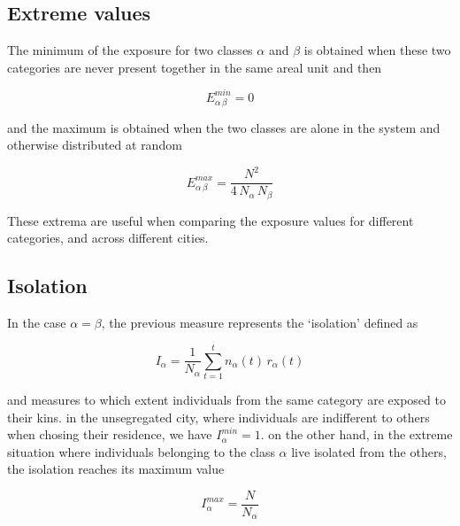 \subsection{Extreme values}
\label{sub:extreme_values}

The minimum of the exposure for two classes $\alpha$ and $\beta$ is obtained
when these two categories are never present together in the same areal unit and
then

\begin{equation}
    E_{\alpha\,\beta}^{min} = 0 
\end{equation}

and the maximum is obtained when the two classes are alone in the system and
otherwise distributed at random

\begin{equation}
    E_{\alpha\,\beta}^{max} = \frac{N^2}{4\,N_\alpha\, N_\beta}
\end{equation}

These extrema are useful when comparing the exposure values for different
categories, and across different cities.



\subsection{Isolation}
\label{sub:isolation}

In the case $\alpha = \beta$, the previous measure represents the
`isolation' defined as

\begin{equation}
    I_\alpha = \frac{1}{N_\alpha}\sum_{t=1}^{t} n_\alpha(t)\,r_\alpha(t)
\end{equation}

and measures to which extent individuals from the same category are
exposed to their kins. in the unsegregated city, where individuals are
indifferent to others when chosing their residence, we have
$I_\alpha^{min}=1$. on the other hand, in the extreme situation where
individuals belonging to the class $\alpha$ live isolated from the
others, the isolation reaches its maximum value

\begin{equation}
    I_\alpha^{max} = \frac{N}{N_\alpha}
\end{equation}


